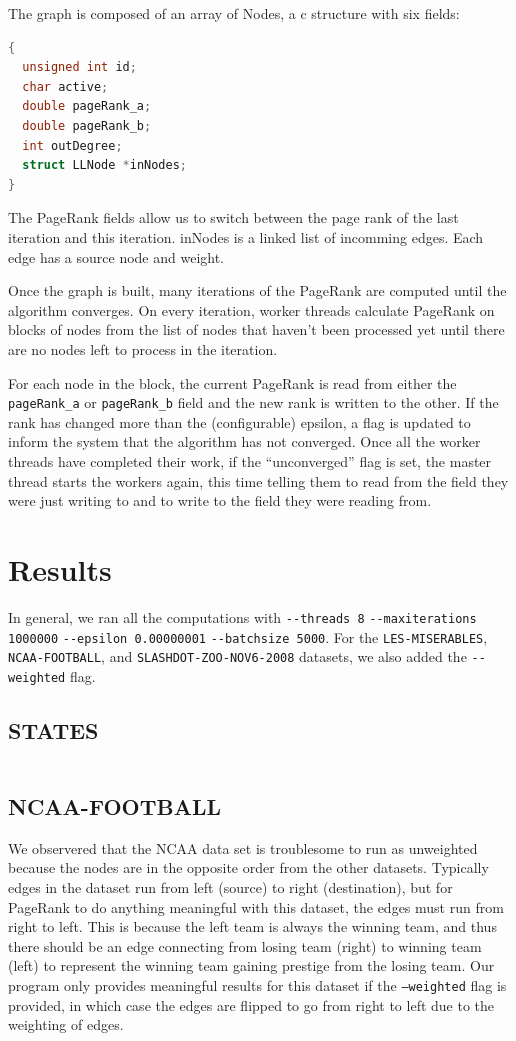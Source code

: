 \documentclass{report}
\newcommand{\results}[1]{\begin{longtabu}{rll}
                           
                         \end{longtabu}\clearpage}
\newcommand{\pagerank}{PageRank }
\begin{document}
The graph is composed of an array of Nodes, a c structure with six fields:
\begin{lstlisting}[language=C]
{
  unsigned int id;
  char active;
  double pageRank_a;
  double pageRank_b;
  int outDegree;
  struct LLNode *inNodes;
}
\end{lstlisting}

The \pagerank fields allow us to switch between the page rank of the last
iteration and this iteration. inNodes is a linked list of incomming edges. Each
edge has a source node and weight.

Once the graph is built, many iterations of the \pagerank are computed until the
algorithm converges. On every iteration, worker threads calculate \pagerank
on blocks of nodes from the list of nodes that haven't been processed yet until
there are no nodes left to process in the iteration.

For each node in the block, the current \pagerank is read from either the
\texttt{pageRank\_a} or \texttt{pageRank\_b} field and the new rank is written
to the other. If the rank has changed more than the (configurable) epsilon, a
flag is updated to inform the system that the algorithm has not converged. Once
all the worker threads have completed their work, if the ``unconverged'' flag is
set, the master thread starts the workers again, this time telling them to read
from the field they were just writing to and to write to the field they were
reading from.

\section{Results}
In general, we ran all the computations with \verb+--threads 8+
\verb+--maxiterations 1000000+ \verb+--epsilon 0.00000001+
\verb+--batchsize 5000+. For the \verb+LES-MISERABLES+, \verb+NCAA-FOOTBALL+, and
\verb+SLASHDOT-ZOO-NOV6-2008+ datasets, we also added the \verb+--weighted+
flag.
\subsection{STATES}
\results{stateborders-results.tex}
\subsection{NCAA-FOOTBALL}
We observered that the NCAA data set is troublesome to run as unweighted because
the nodes are in the opposite order from the other datasets. Typically edges in
the dataset run from left (source) to right (destination), but for \pagerank to
do anything meaningful with this dataset, the edges must run from right to left.
This is because the left team is always the winning team, and thus there should
be an edge connecting from losing team (right) to winning team (left) to
represent the winning team gaining prestige from the losing team. Our program
only provides meaningful results for this dataset if the \texttt{--weighted}
flag is provided, in which case the edges are flipped to go from right to left
due to the weighting of edges.
\end{document}
